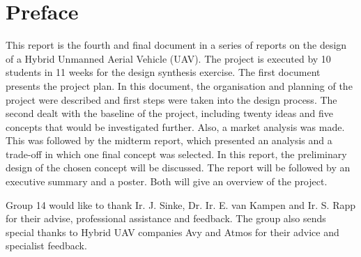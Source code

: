 \chapter*{Preface}%
\setlength{\parindent}{15pt}
\label{ch:pref}


This report is the fourth and final document in a series of reports on the design of a Hybrid Unmanned Aerial Vehicle (UAV). The project is executed by 10 students in 11 weeks for the design synthesis exercise. The first document presents the project plan. In this document, the organisation and planning of the project were described and first steps were taken into the design process. The second dealt with the baseline of the project, including twenty ideas and five concepts that would be investigated further. Also, a market analysis was made. This was followed by the midterm report, which presented an analysis and a trade-off in which one final concept was selected. In this report, the preliminary design of the chosen concept will be discussed. The report will be followed by an executive summary and a poster. Both will give an overview of the project. 

\indent Group 14 would like to thank Ir. J. Sinke, Dr. Ir. E. van Kampen and Ir. S. Rapp for their advise, professional assistance and feedback. The group also sends special thanks to Hybrid UAV companies Avy and Atmos for their advice and specialist feedback. 
